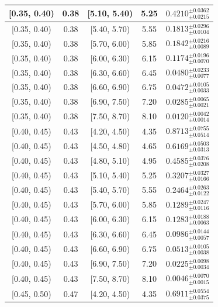 \begin{longtable}{|c|c|c|c|c|}
\hline
[0.35, 0.40) & 0.38 & [5.10, 5.40) & 5.25 & $0.4210^{ \pm 0.0362 }_{ \pm 0.0215 }$ \\ 
\hline
[0.35, 0.40) & 0.38 & [5.40, 5.70) & 5.55 & $0.1813^{ \pm 0.0296 }_{ \pm 0.0104 }$ \\ 
\hline
[0.35, 0.40) & 0.38 & [5.70, 6.00) & 5.85 & $0.1842^{ \pm 0.0216 }_{ \pm 0.0089 }$ \\ 
\hline
[0.35, 0.40) & 0.38 & [6.00, 6.30) & 6.15 & $0.1174^{ \pm 0.0196 }_{ \pm 0.0070 }$ \\ 
\hline
[0.35, 0.40) & 0.38 & [6.30, 6.60) & 6.45 & $0.0480^{ \pm 0.0233 }_{ \pm 0.0077 }$ \\ 
\hline
[0.35, 0.40) & 0.38 & [6.60, 6.90) & 6.75 & $0.0472^{ \pm 0.0105 }_{ \pm 0.0033 }$ \\ 
\hline
[0.35, 0.40) & 0.38 & [6.90, 7.50) & 7.20 & $0.0285^{ \pm 0.0065 }_{ \pm 0.0021 }$ \\ 
\hline
[0.35, 0.40) & 0.38 & [7.50, 8.70) & 8.10 & $0.0120^{ \pm 0.0042 }_{ \pm 0.0014 }$ \\ 
\hline
[0.40, 0.45) & 0.43 & [4.20, 4.50) & 4.35 & $0.8713^{ \pm 0.0755 }_{ \pm 0.0514 }$ \\ 
\hline
[0.40, 0.45) & 0.43 & [4.50, 4.80) & 4.65 & $0.6169^{ \pm 0.0503 }_{ \pm 0.0313 }$ \\ 
\hline
[0.40, 0.45) & 0.43 & [4.80, 5.10) & 4.95 & $0.4585^{ \pm 0.0376 }_{ \pm 0.0208 }$ \\ 
\hline
[0.40, 0.45) & 0.43 & [5.10, 5.40) & 5.25 & $0.3207^{ \pm 0.0327 }_{ \pm 0.0166 }$ \\ 
\hline
[0.40, 0.45) & 0.43 & [5.40, 5.70) & 5.55 & $0.2464^{ \pm 0.0263 }_{ \pm 0.0122 }$ \\ 
\hline
[0.40, 0.45) & 0.43 & [5.70, 6.00) & 5.85 & $0.1289^{ \pm 0.0247 }_{ \pm 0.0116 }$ \\ 
\hline
[0.40, 0.45) & 0.43 & [6.00, 6.30) & 6.15 & $0.1283^{ \pm 0.0188 }_{ \pm 0.0063 }$ \\ 
\hline
[0.40, 0.45) & 0.43 & [6.30, 6.60) & 6.45 & $0.0986^{ \pm 0.0144 }_{ \pm 0.0057 }$ \\ 
\hline
[0.40, 0.45) & 0.43 & [6.60, 6.90) & 6.75 & $0.0513^{ \pm 0.0105 }_{ \pm 0.0038 }$ \\ 
\hline
[0.40, 0.45) & 0.43 & [6.90, 7.50) & 7.20 & $0.0225^{ \pm 0.0098 }_{ \pm 0.0034 }$ \\ 
\hline
[0.40, 0.45) & 0.43 & [7.50, 8.70) & 8.10 & $0.0046^{ \pm 0.0070 }_{ \pm 0.0015 }$ \\ 
\hline
[0.45, 0.50) & 0.47 & [4.20, 4.50) & 4.35 & $0.6911^{ \pm 0.0554 }_{ \pm 0.0375 }$ \\ 

\end{longtable}
